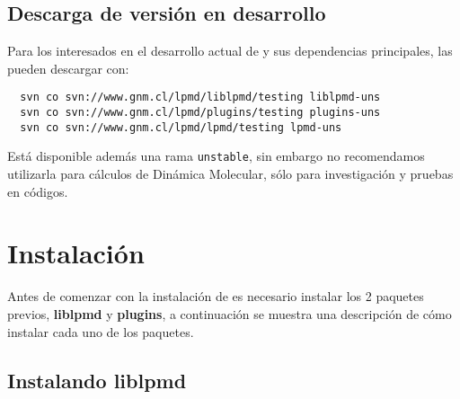 \subsection{Descarga de versi\'on en desarrollo}

Para los interesados en el desarrollo actual de \lpmd y sus dependencias principales, las pueden descargar con:

\begin{center}
 \begin{verbatim}
  svn co svn://www.gnm.cl/lpmd/liblpmd/testing liblpmd-uns
  svn co svn://www.gnm.cl/lpmd/plugins/testing plugins-uns
  svn co svn://www.gnm.cl/lpmd/lpmd/testing lpmd-uns
 \end{verbatim}
\end{center}

Est\'a disponible adem\'as una rama \verb|unstable|, sin embargo no recomendamos utilizarla para c\'alculos de Din\'amica Molecular, s\'olo para investigaci\'on y pruebas en c\'odigos.

\section{Instalaci\'on}
Antes de comenzar con la instalaci\'on de \lpmd es necesario instalar los 2 paquetes previos, \textbf{liblpmd} y \textbf{plugins}, a continuaci\'on se muestra una descripci\'on de c\'omo instalar cada uno de los paquetes.


\subsection{Instalando liblpmd}

% 
% 

